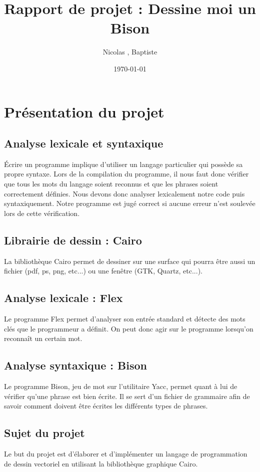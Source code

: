 \documentclass[a4paper, 12pt]{report}
\title{Rapport de projet : Dessine moi un Bison}
\author{Nicolas \bsc{Endredi}, Baptiste \bsc{Oruezabal}}
\date{\today}
\begin{document}
\maketitle


\setcounter{tocdepth}{3}
\tableofcontents

\newpage
\section{Présentation du projet}
\subsection{Analyse lexicale et syntaxique}
Écrire un programme implique d'utiliser un langage particulier qui possède sa propre syntaxe. Lors de la compilation du programme, il nous faut donc vérifier que tous les mots du langage soient reconnus et que les phrases soient correctement définies. Nous devons donc analyser lexicalement notre code puis syntaxiquement. Notre programme est jugé correct si aucune erreur n'est soulevée lors de cette vérification.

\subsection{Librairie de dessin : Cairo}
La bibliothèque Cairo permet de dessiner sur une surface qui pourra être aussi un fichier (pdf, ps, png, etc...) ou une fenêtre (GTK, Quartz, etc...).

\subsection{Analyse lexicale : Flex}
Le programme Flex permet d'analyser son entrée standard et détecte des mots clés que le programmeur a définit. On peut donc agir sur le programme lorsqu'on reconnaît un certain mot.

\subsection{Analyse syntaxique : Bison}
Le programme Bison, jeu de mot sur l'utilitaire Yacc, permet quant à lui de vérifier qu'une phrase est bien écrite. Il se sert d'un fichier de grammaire afin de savoir comment doivent être écrites les différents types de phrases.

\subsection{Sujet du projet}
Le but du projet est d'élaborer et d'implémenter un langage de programmation de dessin vectoriel en utilisant la bibliothèque graphique Cairo.
\end{document}
